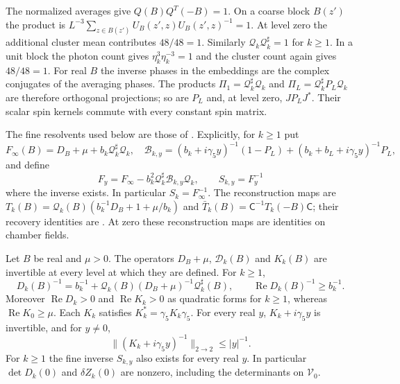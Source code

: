 \documentclass[11pt,letterpaper,reqno]{amsart}
\begin{document}
The normalized averages give
$Q(B)Q^T(-B)=1$. On a coarse block $B(z')$ the product
is
$L^{-3}\sum_{z\in B(z')}U_B(z',z)U_B(z',z)^{-1}=1$.
At level zero the additional cluster mean contributes
$48/48=1$. Similarly
$\mathcal Q_k\mathcal Q_k^\sharp=1$ for $k\ge1$.
In a unit block the photon count gives
$\eta_k^3\eta_k^{-3}=1$ and the cluster count again
gives $48/48=1$.
For real $B$ the inverse phases in the embeddings are
the complex conjugates of the averaging phases.
The products $\Pi_1=\mathcal Q_k^\sharp\mathcal Q_k$
and $\Pi_L=\mathcal Q_k^\sharp P_L\mathcal Q_k$ are
therefore orthogonal projections; so are $P_L$ and,
at level zero, $JP_LJ^*$. Their scalar spin kernels
commute with every constant spin matrix.

The fine resolvents used below are those of
\cite[\S4.2]{FermionBlockManuscript}. Explicitly, for $k\ge1$ put
\[
 F_\infty(B)=D_B+\mu+b_k\mathcal Q_k^\sharp\mathcal Q_k,
 \quad
 \mathcal B_{k,y}=(b_k+i\gamma_5y)^{-1}(1-P_L)
                  +(b_k+b_L+i\gamma_5y)^{-1}P_L,
\]
and define
\[
 F_y=F_\infty-b_k^2\mathcal Q_k^\sharp\mathcal B_{k,y}\mathcal Q_k,
 \qquad S_{k,y}=F_y^{-1}
\]
where the inverse exists. In particular $S_k=F_\infty^{-1}$.
The reconstruction maps are
$T_k(B)=\mathcal Q_k(B)(b_k^{-1}D_B+1+\mu/b_k)$ and
$\bar T_k(B)=\mathsf C^{-1}T_k(-B)\mathsf C$;
their recovery identities are \cite[Theorem~B(iv)]{NormalizedContraction}.
At zero these reconstruction maps are identities on chamber fields.

\begin{proposition}\label{prop:rg-step-real-inverses}
Let $B$ be real and $\mu>0$. The operators
$D_B+\mu$, $\mathcal D_k(B)$ and $K_k(B)$ are
invertible at every level at which they are defined.
For $k\ge1$,
\begin{equation}\label{eq:rg-step-real-coarse-inverse}
 D_k(B)^{-1}=b_k^{-1}
           +\mathcal Q_k(B)(D_B+\mu)^{-1}\mathcal Q_k^\sharp(B),
 \qquad \operatorname{Re}D_k(B)^{-1}\ge b_k^{-1}.
\end{equation}
Moreover $\operatorname{Re}D_k>0$ and
$\operatorname{Re}K_k>0$ as quadratic forms for
$k\ge1$, whereas $\operatorname{Re}K_0\ge\mu$.
Each $K_k$ satisfies
$K_k^*=\gamma_5K_k\gamma_5$.
For every real $y$, $K_k+i\gamma_5y$ is invertible,
and for $y\ne0$,
\begin{equation}\label{eq:rg-step-real-resolvent}
 \|(K_k+i\gamma_5y)^{-1}\|_{2\to2}\le |y|^{-1}.
\end{equation}
For $k\ge1$ the fine inverse $S_{k,y}$ also
exists for every real $y$.
In particular $\det D_k(0)$ and $\delta Z_k(0)$
are nonzero, including the determinants on
$\mathscr V_0$.
\end{proposition}
\end{document}
